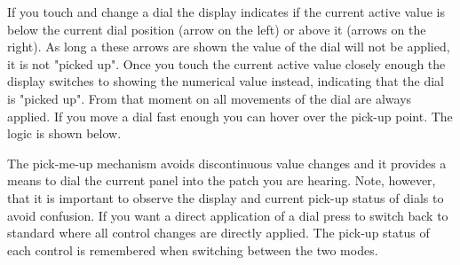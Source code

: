 If you touch and change a dial the display indicates if the current active value is below the current dial position (arrow on the left) or above it (arrows on the right). As long a these arrows are shown the value of the dial will not be applied, it is not "picked up". Once you touch the current active value closely enough the display switches to showing the numerical value instead, indicating that the dial is "picked up". From that moment on all movements of the dial are always applied. If you move a dial fast enough you can hover over the pick-up point. The logic is shown below.


The pick-me-up mechanism avoids discontinuous value changes and it provides a means to dial the current panel into the patch you are hearing. Note, however, that it is important to observe the display and current pick-up status of dials to avoid confusion. If you want a direct application of a dial press \totape to switch back to standard \presetpatch where all control changes are directly applied. The pick-up status of each control is remembered when switching between the two modes.

